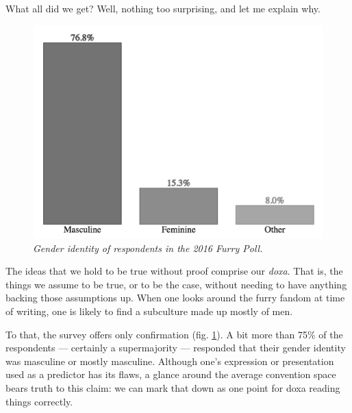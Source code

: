 What all did we get?  Well, nothing too surprising, and let me explain why.

\begin{figure}
  \centering
  \includegraphics[scale=0.45]{assets/identity.png}
  \caption{\textit{Gender identity of respondents in the 2016 Furry Poll.}}
  \label{fig:identity}
\end{figure}

The ideas that we hold to be true without proof comprise our \textit{doxa}.  That is, the things we assume to be true, or to be the case, without needing to have anything backing those assumptions up.  When one looks around the furry fandom at time of writing, one is likely to find a subculture made up mostly of men.

To that, the survey offers only confirmation (fig. \ref{fig:identity}).  A bit more than 75\% of the respondents --- certainly a supermajority --- responded that their gender identity was masculine or mostly masculine.  Although one's expression or presentation used as a predictor has its flaws, a glance around the average convention space bears truth to this claim: we can mark that down as one point for doxa reading things correctly.


